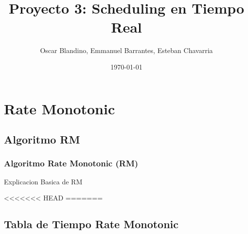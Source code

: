 \documentclass[xcolor=table]{beamer}
\title[Proyecto 3]{Proyecto 3: Scheduling en Tiempo Real} %
\author{Oscar Blandino, Emmanuel Barrantes, Esteban Chavarria} %
\institute[TEC] %
{
Tecnologico de Costa Rica \\ %
Sistemas Operativos Avanzados \\
I Semestre - 2018
\medskip
\textit{} %
}
\date{\today} %
\begin{document}
\begin{frame}
\titlepage %
\end{frame}



\section{Rate Monotonic}

\subsection{Algoritmo RM}

\begin{frame} 
\frametitle{Algoritmo Rate Monotonic (RM)} 
Explicacion Basica de RM \\
\end{frame}

<<<<<<< HEAD
=======
\subsection{Tabla de Tiempo  Rate Monotonic } 
\end{document}
